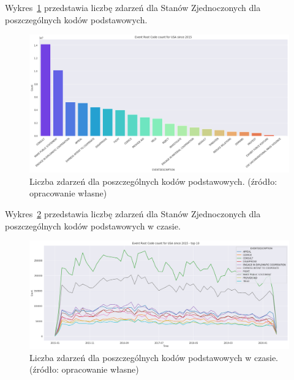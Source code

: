 \documentclass[11pt]{report}
\begin{document}
    Wykres~\ref{fig:USAPERC} przedstawia liczbę zdarzeń dla Stanów Zjednoczonych dla poszczególnych kodów podstawowych.

    \begin{figure}[!htp]
        \centering
        \includegraphics[width=1 \textwidth]{fig/USA/USAERC.png}
        \caption{Liczba zdarzeń dla poszczególnych kodów podstawowych. (źródło: opracowanie własne)}
        \label{fig:USAPERC}
    \end{figure}

    Wykres~\ref{fig:USAPERCinTIME} przedstawia liczbę zdarzeń dla Stanów Zjednoczonych dla poszczególnych kodów podstawowych w czasie.
    \begin{figure}[!htp]
        \centering
        \includegraphics[width=1 \textwidth]{fig/USA/USAERCinTIME.png}
        \caption{Liczba zdarzeń dla poszczególnych kodów podstawowych w czasie. (źródło: opracowanie własne)}
        \label{fig:USAPERCinTIME}
    \end{figure}
\end{document}
